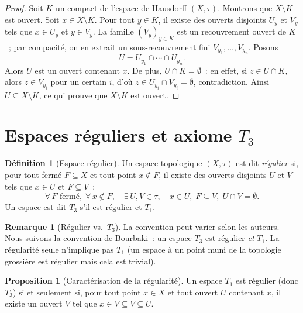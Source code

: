 \documentclass[12pt,a4paper,openany]{book}
\theoremstyle{definition}
\newtheorem{definition}{Définition}[chapter]
\theoremstyle{cours}
\newtheorem{proposition}[theoreme]{Proposition}
\theoremstyle{coursnormal}
\newtheorem{remarque}[theoreme]{Remarque}
\begin{document}
\begin{proof}
  Soit $K$ un compact de l'espace de Hausdorff $(X,\tau)$. Montrons que
  $X\setminus K$ est ouvert. Soit $x\in X\setminus K$. Pour tout $y\in K$,
  il existe des ouverts disjoints $U_y$ et $V_y$ tels que $x\in U_y$ et
  $y\in V_y$. La famille $(V_y)_{y\in K}$ est un recouvrement ouvert de $K$~;
  par compacité, on en extrait un sous-recouvrement fini
  $V_{y_1},\ldots,V_{y_n}$. Posons
  \[
    U = U_{y_1}\cap\cdots\cap U_{y_n}.
  \]
  Alors $U$ est un ouvert contenant $x$. De plus, $U\cap K=\emptyset$~: en
  effet, si $z\in U\cap K$, alors $z\in V_{y_i}$ pour un certain $i$, d'où
  $z\in U_{y_i}\cap V_{y_i}=\emptyset$, contradiction. Ainsi
  $U\subseteq X\setminus K$, ce qui prouve que $X\setminus K$ est ouvert.
\end{proof}

\section{Espaces réguliers et axiome $T_3$}\label{sec:T3}

\begin{definition}[Espace régulier]\label{def:regulier}
  Un espace topologique
  $(X,\tau)$ est dit \emph{régulier} si, pour tout fermé $F\subseteq X$ et
  tout point $x\notin F$, il existe des ouverts disjoints $U$ et $V$ tels que
  $x\in U$ et $F\subseteq V$~:
  \[
    \forall\, F \text{ fermé},\;\forall\, x\notin F,\quad
    \exists\, U,V\in\tau,\quad
    x\in U,\; F\subseteq V,\; U\cap V=\emptyset.
  \]
  Un espace est dit \emph{$T_3$} s'il est régulier et $T_1$.
\end{definition}

\begin{remarque}[Régulier vs.\ $T_3$]\label{rem:rem:regulier-T3}
  La convention peut varier selon les auteurs. Nous suivons la convention de
  Bourbaki~: un espace $T_3$ est régulier \emph{et} $T_1$. La régularité
  seule n'implique pas $T_1$ (un espace à un point muni de la topologie
  grossière est régulier mais cela est trivial).
\end{remarque}

\begin{proposition}[Caractérisation de la régularité]\label{prop:regulier-carac}
  Un espace $T_1$ est régulier (donc $T_3$) si et seulement si, pour tout
  point $x\in X$ et tout ouvert $U$ contenant $x$, il existe un ouvert $V$
  tel que $x\in V\subseteq\overline{V}\subseteq U$.
\end{proposition}
\end{document}
